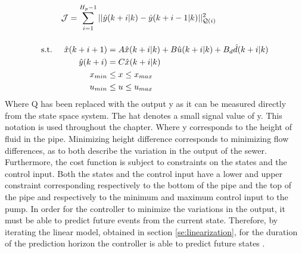 \begin{equation}\label{eq:cost_function_height}
\begin{aligned}
	 \CMcal{J} = \sum_{i=1}^{H_p-1} || \hat{y}&(k+i|k)-\hat{y}(k+i-1|k)||_{\CMcal{Q}(i)}^2 \\[12pt]
	\text{s.t.} \hspace{5mm}  \hat{x}(k+i+1) &= A\hat{x}(k+i|k)+B\hat{u}(k+i|k)+B_d\hat{d}(k+i|k) \\
						      \hat{y}(k+i)&= C\hat{x}(k+i|k) \\
						     x_{min} &\leq  x \leq x_{max} \\
						     u_{min} & \leq u \leq u_{max}
	\end{aligned}
\end{equation}
Where Q has been replaced with the output y as it can be measured directly from the state space system. The hat denotes a small signal value of y. This notation is used throughout the chapter. Where y corresponds to the height of fluid in the pipe. Minimizing height difference corresponds to minimizing flow differences, as to both describe the variation in the output of the sewer. Furthermore, the cost function is subject to constraints on the states and the control input. Both the states and the control input have a lower and upper constraint corresponding respectively to the bottom of the pipe and the top of the pipe and respectively to the minimum and maximum control input to the pump. In order for the controller to minimize the variations in the output, it must be able to predict future events from the current state. Therefore, by iterating the linear model, obtained in section \ref{se:linearization}, for the duration of the prediction horizon the controller is able to predict future states \cite{maciejowski2002predictive}.



